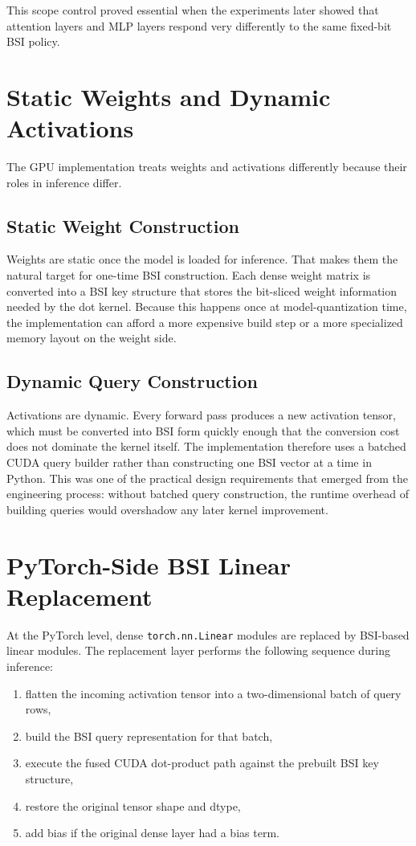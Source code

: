 This scope control proved essential when the experiments later showed that attention layers and MLP layers respond very differently to the same fixed-bit BSI policy.

\section{Static Weights and Dynamic Activations}
The GPU implementation treats weights and activations differently because their roles in inference differ.

\subsection{Static Weight Construction}
Weights are static once the model is loaded for inference. That makes them the natural target for one-time BSI construction. Each dense weight matrix is converted into a BSI key structure that stores the bit-sliced weight information needed by the dot kernel. Because this happens once at model-quantization time, the implementation can afford a more expensive build step or a more specialized memory layout on the weight side.

\subsection{Dynamic Query Construction}
Activations are dynamic. Every forward pass produces a new activation tensor, which must be converted into BSI form quickly enough that the conversion cost does not dominate the kernel itself. The implementation therefore uses a batched CUDA query builder rather than constructing one BSI vector at a time in Python. This was one of the practical design requirements that emerged from the engineering process: without batched query construction, the runtime overhead of building queries would overshadow any later kernel improvement.

\section{PyTorch-Side BSI Linear Replacement}
At the PyTorch level, dense \texttt{torch.nn.Linear} modules are replaced by BSI-based linear modules. The replacement layer performs the following sequence during inference:

\begin{enumerate}[leftmargin=2em]
\item flatten the incoming activation tensor into a two-dimensional batch of query rows,
\item build the BSI query representation for that batch,
\item execute the fused CUDA dot-product path against the prebuilt BSI key structure,
\item restore the original tensor shape and dtype,
\item add bias if the original dense layer had a bias term.
\end{enumerate}

